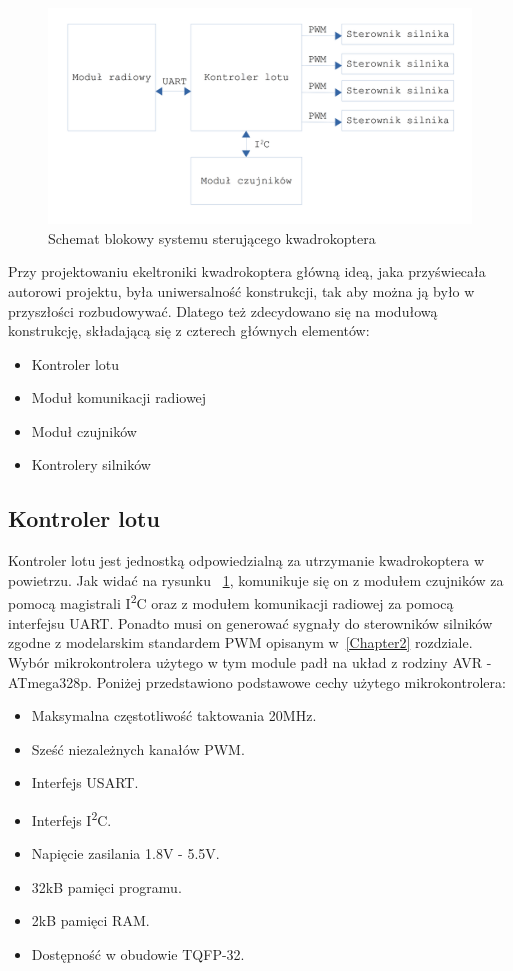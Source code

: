 \begin{figure}[H]
	\centering
	\includegraphics[scale=0.1]{Pictures/QuadroSchematIdeowy.png}
	\caption[Schemat blokowy kwadrokoptera]{Schemat blokowy systemu sterującego kwadrokoptera}
	\label{fig:QuadroSchematIdeowy}
\end{figure}

Przy projektowaniu ekeltroniki kwadrokoptera główną ideą, jaka przyświecała autorowi projektu, była uniwersalność konstrukcji, tak aby można ją było w przyszłości rozbudowywać. Dlatego też zdecydowano się na modułową konstrukcję, składającą się z czterech głównych elementów:
\begin{itemize}
	\item Kontroler lotu
	\item Moduł komunikacji radiowej
	\item Moduł czujników
	\item Kontrolery silników
\end{itemize}

\subsection{Kontroler lotu}
Kontroler lotu jest jednostką odpowiedzialną za utrzymanie kwadrokoptera w powietrzu. Jak widać na rysunku ~\ref{fig:QuadroSchematIdeowy}, komunikuje się on z modułem czujników za pomocą magistrali I\textsuperscript{2}C oraz z modułem komunikacji radiowej za pomocą interfejsu UART. Ponadto musi on generować sygnały do sterowników silników zgodne z modelarskim standardem PWM opisanym w~\ref{Chapter2} rozdziale. Wybór mikrokontrolera użytego w tym module padł na układ z rodziny AVR - ATmega328p. Poniżej przedstawiono podstawowe cechy użytego mikrokontrolera:

\begin{itemize}
	\item Maksymalna częstotliwość taktowania 20MHz.
	\item Sześć niezależnych kanałów PWM.
	\item Interfejs USART.
	\item Interfejs I\textsuperscript{2}C.
	\item Napięcie zasilania 1.8V - 5.5V.
	\item 32kB pamięci programu.
	\item 2kB pamięci RAM.
	\item Dostępność w obudowie TQFP-32.
\end{itemize}

